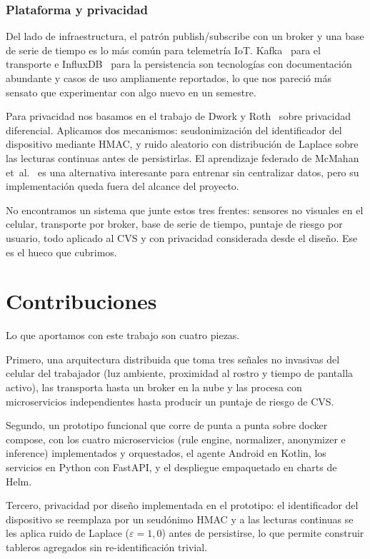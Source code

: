 \documentclass[conference]{IEEEtran}
\begin{document}
\subsubsection*{Plataforma y privacidad}

Del lado de infraestructura, el patrón publish/subscribe con un broker 
y una base de serie de tiempo es lo más común para telemetría IoT. 
Kafka~\cite{kafka} para el transporte e InfluxDB~\cite{influxdata} para 
la persistencia son tecnologías con documentación abundante y casos de 
uso ampliamente reportados, lo que nos pareció más sensato que 
experimentar con algo nuevo en un semestre.

Para privacidad nos basamos en el trabajo de Dwork y 
Roth~\cite{dwork2014} sobre privacidad diferencial. Aplicamos dos 
mecanismos: seudonimización del identificador del dispositivo mediante 
HMAC, y ruido aleatorio con distribución de Laplace sobre las lecturas 
continuas antes de persistirlas. El aprendizaje federado de McMahan 
et~al.~\cite{mcmahan2017} es una alternativa interesante para entrenar 
sin centralizar datos, pero su implementación queda fuera del alcance 
del proyecto.

\medskip

No encontramos un sistema que junte estos tres frentes: sensores no 
visuales en el celular, transporte por broker, base de serie de tiempo, 
puntaje de riesgo por usuario, todo aplicado al CVS y con privacidad 
considerada desde el diseño. Ese es el hueco que cubrimos.

\section{Contribuciones}

Lo que aportamos con este trabajo son cuatro piezas.

Primero, una arquitectura distribuida que toma tres señales no invasivas 
del celular del trabajador (luz ambiente, proximidad al rostro y tiempo 
de pantalla activo), las transporta hasta un broker en la nube y las 
procesa con microservicios independientes hasta producir un puntaje de 
riesgo de CVS.

Segundo, un prototipo funcional que corre de punta a punta sobre 
docker compose, con los cuatro microservicios (rule engine, normalizer, 
anonymizer e inference) implementados y orquestados, el agente Android 
en Kotlin, los servicios en Python con FastAPI, y el despliegue 
empaquetado en charts de Helm.

Tercero, privacidad por diseño implementada en el prototipo: el 
identificador del dispositivo se reemplaza por un seudónimo HMAC y a 
las lecturas continuas se les aplica ruido de Laplace 
($\varepsilon = 1{,}0$) antes de persistirse, lo que permite construir 
tableros agregados sin re-identificación trivial.
\end{document}
